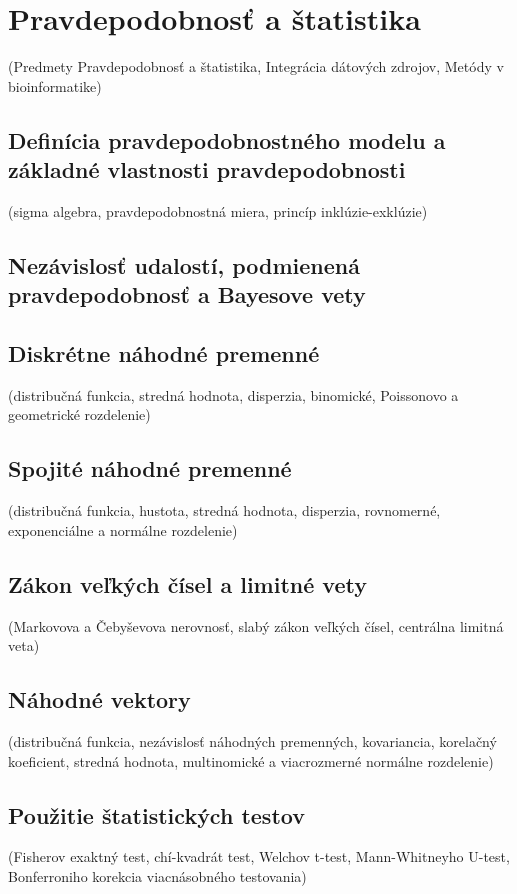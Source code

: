 \chapter[Pravdepodobnosť a štatistika]{Pravdepodobnosť a štatistika}
\label{pravdepodobnost_a_statistika} %

(Predmety Pravdepodobnosť a štatistika, Integrácia dátových zdrojov, Metódy v bioinformatike)

\section{Definícia pravdepodobnostného modelu a základné vlastnosti pravdepodobnosti​}

	(sigma algebra, pravdepodobnostná miera, princíp inklúzie-exklúzie)

\section{Nezávislosť udalostí, podmienená pravdepodobnosť a Bayesove vety}

\section{Diskrétne náhodné premenné​}

	(distribučná funkcia, stredná hodnota, disperzia, binomické, Poissonovo a geometrické rozdelenie)

\section{Spojité náhodné premenné​}
	(distribučná funkcia, hustota, stredná hodnota, disperzia, rovnomerné,
exponenciálne a normálne rozdelenie)

\section{Zákon veľkých čísel a limitné vety​}

	(Markovova a Čebyševova nerovnosť, slabý zákon veľkých čísel, centrálna limitná veta)

\section{Náhodné vektory​}

	(distribučná funkcia, nezávislosť náhodných premenných, kovariancia, korelačný koeficient, stredná hodnota, multinomické a viacrozmerné normálne rozdelenie)

\section{Použitie štatistických testov​}

	(Fisherov exaktný test, chí-kvadrát test, Welchov t-test, Mann-Whitneyho U-test, Bonferroniho korekcia viacnásobného testovania)
